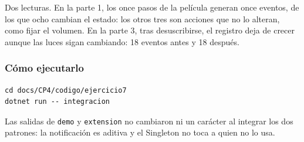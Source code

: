 Dos lecturas. En la parte 1, los once pasos de la película generan once eventos, de los que
ocho cambian el estado: los otros tres son acciones que no lo alteran, como fijar el volumen.
En la parte 3, tras desuscribirse, el registro deja de crecer aunque las luces sigan
cambiando: 18 eventos antes y 18 después.

\subsubsection*{Cómo ejecutarlo}

{\small
\begin{verbatim}
cd docs/CP4/codigo/ejercicio7
dotnet run -- integracion
\end{verbatim}
}

Las salidas de \texttt{demo} y \texttt{extension} no cambiaron ni un carácter al integrar los
dos patrones: la notificación es aditiva y el Singleton no toca a quien no lo usa.

\fussy
